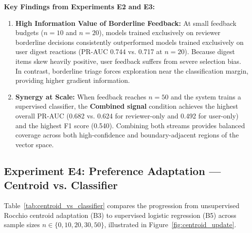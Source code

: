 \noindent\textbf{Key Findings from Experiments E2 and E3:}
\begin{enumerate}
    \item \textbf{High Information Value of Borderline Feedback:} At small feedback budgets ($n=10$ and $n=20$), models trained exclusively on reviewer borderline decisions consistently outperformed models trained exclusively on user digest reactions (PR-AUC 0.744 vs. 0.717 at $n=20$). Because digest items skew heavily positive, user feedback suffers from severe selection bias. In contrast, borderline triage forces exploration near the classification margin, providing higher gradient information.
    \item \textbf{Synergy at Scale:} When feedback reaches $n=50$ and the system trains a supervised classifier, the \textbf{Combined signal} condition achieves the highest overall PR-AUC (0.682 vs. 0.624 for reviewer-only and 0.492 for user-only) and the highest F1 score (0.540). Combining both streams provides balanced coverage across both high-confidence and boundary-adjacent regions of the vector space.
\end{enumerate}

\subsection{Experiment E4: Preference Adaptation --- Centroid vs. Classifier}
\label{sec:exp_e4}

Table~\ref{tab:centroid_vs_classifier} compares the progression from unsupervised Rocchio centroid adaptation (B3) to supervised logistic regression (B5) across sample sizes $n \in \{0, 10, 20, 30, 50\}$, illustrated in Figure~\ref{fig:centroid_update}.

